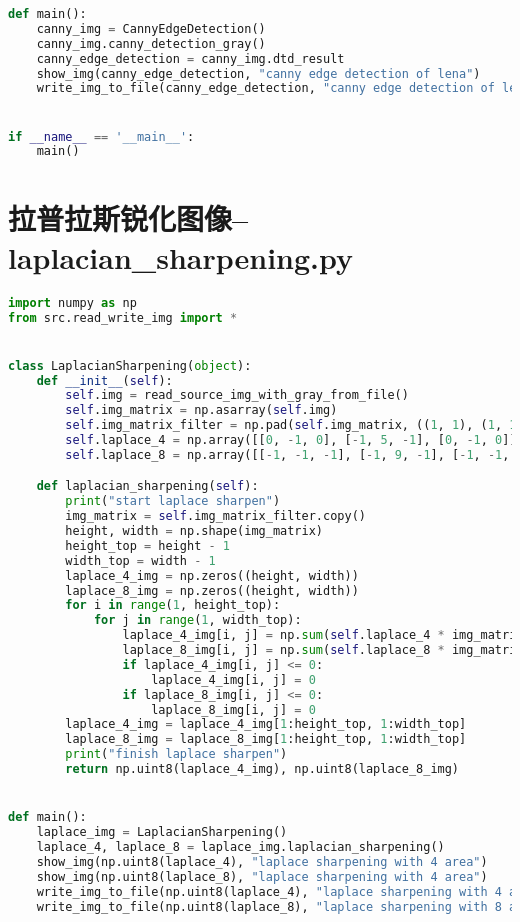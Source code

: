 \documentclass{hitreport}
\begin{document}
\begin{appendices}
\begin{lstlisting}[language=python]
def main():
    canny_img = CannyEdgeDetection()
    canny_img.canny_detection_gray()
    canny_edge_detection = canny_img.dtd_result
    show_img(canny_edge_detection, "canny edge detection of lena")
    write_img_to_file(canny_edge_detection, "canny edge detection of lena")


if __name__ == '__main__':
    main()

\end{lstlisting}

\section{拉普拉斯锐化图像--laplacian\_sharpening.py}\label{app:lap}
\begin{lstlisting}[language=python]
import numpy as np
from src.read_write_img import *


class LaplacianSharpening(object):
    def __init__(self):
        self.img = read_source_img_with_gray_from_file()
        self.img_matrix = np.asarray(self.img)
        self.img_matrix_filter = np.pad(self.img_matrix, ((1, 1), (1, 1)), 'constant', constant_values=(0, 0))
        self.laplace_4 = np.array([[0, -1, 0], [-1, 5, -1], [0, -1, 0]])
        self.laplace_8 = np.array([[-1, -1, -1], [-1, 9, -1], [-1, -1, -1]])

    def laplacian_sharpening(self):
        print("start laplace sharpen")
        img_matrix = self.img_matrix_filter.copy()
        height, width = np.shape(img_matrix)
        height_top = height - 1
        width_top = width - 1
        laplace_4_img = np.zeros((height, width))
        laplace_8_img = np.zeros((height, width))
        for i in range(1, height_top):
            for j in range(1, width_top):
                laplace_4_img[i, j] = np.sum(self.laplace_4 * img_matrix[i - 1:i + 2, j - 1:j + 2])
                laplace_8_img[i, j] = np.sum(self.laplace_8 * img_matrix[i - 1:i + 2, j - 1:j + 2])
                if laplace_4_img[i, j] <= 0:
                    laplace_4_img[i, j] = 0
                if laplace_8_img[i, j] <= 0:
                    laplace_8_img[i, j] = 0
        laplace_4_img = laplace_4_img[1:height_top, 1:width_top]
        laplace_8_img = laplace_8_img[1:height_top, 1:width_top]
        print("finish laplace sharpen")
        return np.uint8(laplace_4_img), np.uint8(laplace_8_img)


def main():
    laplace_img = LaplacianSharpening()
    laplace_4, laplace_8 = laplace_img.laplacian_sharpening()
    show_img(np.uint8(laplace_4), "laplace sharpening with 4 area")
    show_img(np.uint8(laplace_8), "laplace sharpening with 4 area")
    write_img_to_file(np.uint8(laplace_4), "laplace sharpening with 4 area")
    write_img_to_file(np.uint8(laplace_8), "laplace sharpening with 8 area")



\end{lstlisting}
\end{appendices}
\end{document}
